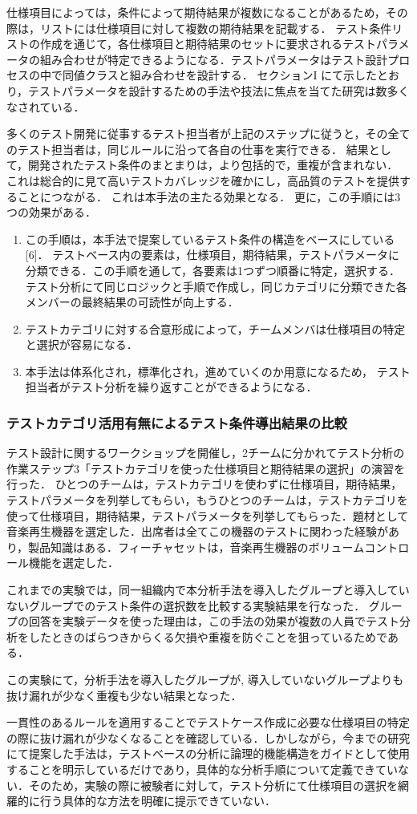 仕様項目によっては，条件によって期待結果が複数になることがあるため，その際は，リストには仕様項目に対して複数の期待結果を記載する．
テスト条件リストの作成を通じて，各仕様項目と期待結果のセットに要求されるテストパラメータの組み合わせが特定できるようになる．テストパラメータはテスト設計プロセスの中で同値クラスと組み合わせを設計する．
セクションI にて示したとおり，テストパラメータを設計するための手法や技法に焦点を当てた研究は数多くなされている．


多くのテスト開発に従事するテスト担当者が上記のステップに従うと，その全てのテスト担当者は，同じルールに沿って各自の仕事を実行できる．
結果として，開発されたテスト条件のまとまりは，より包括的で，重複が含まれない．
これは総合的に見て高いテストカバレッジを確かにし，高品質のテストを提供することにつながる．
これは本手法の主たる効果となる．
更に，この手順には3つの効果がある．

\begin{enumerate}
\item この手順は，本手法で提案しているテスト条件の構造をベースにしている [6]． テストベース内の要素は，仕様項目，期待結果，テストパラメータに分類できる．この手順を通して，各要素は1つずつ順番に特定，選択する． テスト分析にて同じロジックと手順で作成し，同じカテゴリに分類できた各メンバーの最終結果の可読性が向上する．
\item テストカテゴリに対する合意形成によって，チームメンバは仕様項目の特定と選択が容易になる．
\item 本手法は体系化され，標準化され，進めていくのか用意になるため， テスト担当者がテスト分析を繰り返すことができるようになる．
\end{enumerate}

\subsubsection{テストカテゴリ活用有無によるテスト条件導出結果の比較}

テスト設計に関するワークショップを開催し，2チームに分かれてテスト分析の作業ステップ3「テストカテゴリを使った仕様項目と期待結果の選択」の演習を行った．
ひとつのチームは，テストカテゴリを使わずに仕様項目，期待結果，テストパラメータを列挙してもらい，もうひとつのチームは，テストカテゴリを使って仕様項目，期待結果，テストパラメータを列挙してもらった．題材として音楽再生機器を選定した．出席者は全てこの機器のテストに関わった経験があり，製品知識はある．フィーチャセットは，音楽再生機器のボリュームコントロール機能を選定した．

これまでの実験では，同一組織内で本分析手法を導入したグループと導入していないグループでのテスト条件の選択数を比較する実験結果を行なった．
グループの回答を実験データを使った理由は，この手法の効果が複数の人員でテスト分析をしたときのばらつきからくる欠損や重複を防ぐことを狙っているためである．

この実験にて，分析手法を導入したグループが, 導入していないグループよりも抜け漏れが少なく重複も少ない結果となった．

一貫性のあるルールを適用することでテストケース作成に必要な仕様項目の特定の際に抜け漏れが少なくなることを確認している．しかしながら，今までの研究にて提案した手法は，テストベースの分析に論理的機能構造をガイドとして使用することを明示しているだけであり，具体的な分析手順について定義できていない．そのため，実験の際に被験者に対して，テスト分析にて仕様項目の選択を網羅的に行う具体的な方法を明確に提示できていない．

